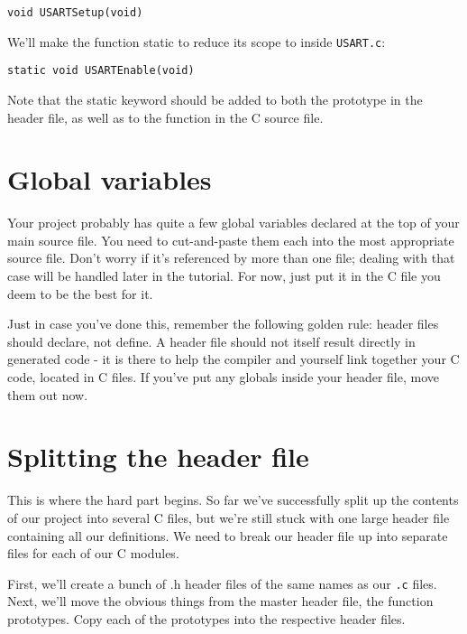 \documentclass[a4paper,oneside]{book}
\begin{document}
\begin{center}
\begin{lstlisting}
void USARTSetup(void)
\end{lstlisting}
\end{center}

We'll make the function static to reduce its scope to inside \texttt{USART.c}:

\begin{center}
\begin{lstlisting}
static void USARTEnable(void)
\end{lstlisting}
\end{center}

Note that the static keyword should be added to both the prototype in the header file, as well as to the function in the C source file.

\section{Global variables}

Your project probably has quite a few global variables declared at the top of your main source file. You need to cut-and-paste them each into the most appropriate source file. Don't worry if it's referenced by more than one file; dealing with that case will be handled later in the tutorial. For now, just put it in the C file you deem to be the best for it.

Just in case you've done this, remember the following golden rule: header files should declare, not define. A header file should not itself result directly in generated code - it is there to help the compiler and yourself link together your C code, located in C files. If you've put any globals inside your header file, move them out now.

\section{Splitting the header file}

This is where the hard part begins. So far we've successfully split up the contents of our project into several C files, but we're still stuck with one large header file containing all our definitions. We need to break our header file up into separate files for each of our C modules.

First, we'll create a bunch of .h header files of the same names as our \texttt{.c} files. Next, we'll move the obvious things from the master header file, the function prototypes. Copy each of the prototypes into the respective header files.
\end{document}
